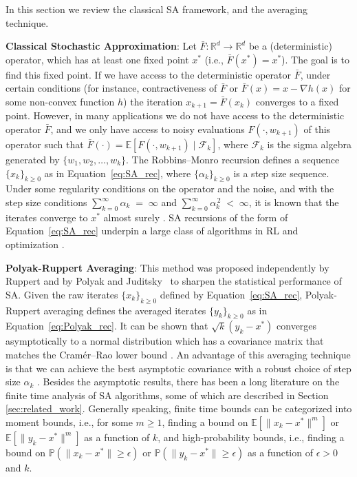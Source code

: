 \documentclass[letterpaper, 10 pt]{article}
\newcommand{\E}{\mathbb{E}}
\begin{document}
In this section we review the classical SA framework, and the averaging technique. 

\smallskip

\textbf{Classical Stochastic Approximation}: Let $\bar{F} : \mathbb{R}^d \to \mathbb{R}^d$ be a (deterministic) operator, which has at least one fixed point $x^*$ (i.e., $\bar{F}(x^*)=x^*$). The goal is to find this fixed point. If we have access to the deterministic operator $\bar{F}$, under certain conditions (for instance, contractiveness of $\bar{F}$ or $\bar{F}(x)=x-\nabla h(x)$ for some non-convex function $h$) the iteration $x_{k+1}=\bar{F}(x_k)$ converges to a fixed point. However, in many applications we do not have access to the deterministic operator $\bar{F}$, and we only have access to noisy evaluations $F(\cdot,w_{k+1})$ of this operator such that $\bar{F}(\cdot)=\mathbb{E}[F(\cdot, w_{k+1})\mid \mathcal{F}_k]$, where $\mathcal{F}_k$ is the sigma algebra generated by $\{w_1,w_2,\dots,w_k\}$. The Robbins--Monro recursion \cite{robbins1951stochastic} defines a sequence $\{x_k\}_{k\ge 0}$ as in Equation~\eqref{eq:SA_rec}, where $\{\alpha_k\}_{k\ge 0}$ is a step size sequence. Under some regularity conditions on the operator and the noise, and with the step size conditions $\sum_{k=0}^{\infty} \alpha_k \;=\; \infty$ and $\sum_{k=0}^{\infty} \alpha_k^{\,2} \;<\; \infty$, it is known that the iterates converge to $x^*$ almost surely \cite{bertsekas1996neuro}. SA recursions of the form of Equation~\eqref{eq:SA_rec} underpin a large class of algorithms in RL \cite{sutton1988learning, watkins1992q} and optimization \cite{harold1997stochastic}. 

\smallskip

\textbf{Polyak-Ruppert Averaging}: This method was proposed independently by Ruppert and by Polyak and Juditsky~\cite{ruppert1988efficient, polyak1992acceleration} to sharpen the statistical performance of SA. Given the raw iterates $\{x_k\}_{k\geq0}$ defined by Equation~\eqref{eq:SA_rec}, Polyak-Ruppert averaging defines the averaged iterates $\{y_k\}_{k\geq0}$ as in Equation~\eqref{eq:Polyak_rec}. It can be shown that $\sqrt{k}(y_k-x^*)$ converges asymptotically to a normal distribution which has a covariance matrix that matches the Cramér--Rao lower bound  \cite{polyak1992acceleration}. An advantage of this averaging technique is that we can achieve the best asymptotic covariance with a robust choice of step size $\alpha_k$ \cite{nemirovski2009robust}. Besides the asymptotic results, there has been a long literature on the finite time analysis of SA algorithms, some of which are described in Section \ref{sec:related_work}. Generally speaking, finite time bounds can be categorized into moment bounds, i.e., for some $m\geq 1$, finding a bound on $\E[\|x_k-x^*\|^m]$ or $\E[\|y_k-x^*\|^m]$ as a function of $k$, and high-probability bounds, i.e., finding a bound on $\mathbb{P}(\|x_k-x^*\|\geq \epsilon)$ or $\mathbb{P}(\|y_k-x^*\|\geq \epsilon)$ as a function of $\epsilon>0$ and $k$.
\end{document}
